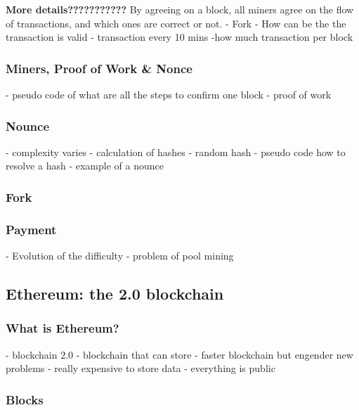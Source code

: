 \textbf{More details???????????}
\newline
By agreeing on a block, all miners agree on the flow of transactions, and which ones are correct or not.
\newline
- Fork
\newline
- How can be the the transaction is valid
\newline
- transaction every 10 mins
\newline
-how much transaction per block
\subsubsection{Miners, Proof of Work \&  Nonce}

- pseudo code of what are all the steps to confirm one block
- proof of work
\subsubsection{Nounce}
- complexity varies
\newline
- calculation of hashes
\newline 
- random hash
\newline
- pseudo code how to resolve a hash
\newline
- example of a nounce
\subsubsection{Fork}
\subsubsection{Payment}
- Evolution of the difficulty
\newline
- problem of pool mining
\subsection{Ethereum: the 2.0 blockchain}
\subsubsection{What is Ethereum?}
- blockchain 2.0
\newline
- blockchain that can store 
\newline
- faster blockchain but engender new problems
\newline
- really expensive to store data
\newline
- everything is public
\subsubsection{Blocks}
